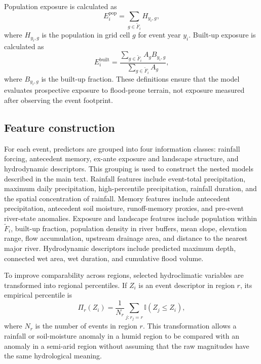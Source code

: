 \documentclass[pdflatex,sn-mathphys-ay]{sn-jnl}
\theoremstyle{thmstyleone}
\theoremstyle{thmstylethree}
\theoremstyle{thmstyletwo}
\begin{document}
\begin{appendices}
Population exposure is calculated as
\begin{equation}
  E^{\mathrm{pop}}_{i}
  =
  \sum_{g\in\widetilde{F}_{i}}
  H_{y_i,g},
  \label{eq:app_pop_exposure}
\end{equation}
where $H_{y_i,g}$ is the population in grid cell $g$ for event year
$y_i$.  Built-up exposure is calculated as
\begin{equation}
  E^{\mathrm{built}}_{i}
  =
  \frac{
    \displaystyle
    \sum_{g\in\widetilde{F}_{i}}
    A_g B_{y_i,g}
  }{
    \displaystyle
    \sum_{g\in\widetilde{F}_{i}} A_g
  },
  \label{eq:app_built_exposure}
\end{equation}
where $B_{y_i,g}$ is the built-up fraction.  These definitions ensure
that the model evaluates prospective exposure to flood-prone terrain,
not exposure measured after observing the event footprint.

\subsection{Feature construction}
\label{app:feature_construction}

For each event, predictors are grouped into four information classes:
rainfall forcing, antecedent memory, ex-ante exposure and landscape
structure, and hydrodynamic descriptors.  This grouping is used to
construct the nested models described in the main text.  Rainfall
features include event-total precipitation, maximum daily
precipitation, high-percentile precipitation, rainfall duration, and
the spatial concentration of rainfall.  Memory features include
antecedent precipitation, antecedent soil moisture, runoff-memory
proxies, and pre-event river-state anomalies.  Exposure and landscape
features include population within $\widetilde{F}_i$, built-up
fraction, population density in river buffers, mean slope, elevation
range, flow accumulation, upstream drainage area, and distance to the
nearest major river.  Hydrodynamic descriptors include predicted
maximum depth, connected wet area, wet duration, and cumulative flood
volume.

To improve comparability across regions, selected hydroclimatic
variables are transformed into regional percentiles.  If $Z_i$ is an
event descriptor in region $r$, its empirical percentile is
\begin{equation}
  \Pi_r(Z_i)
  =
  \frac{1}{N_r}
  \sum_{j:r_j=r}
  \mathbb{I}
  \left(
    Z_j\leq Z_i
  \right),
  \label{eq:app_percentile}
\end{equation}
where $N_r$ is the number of events in region $r$.  This transformation
allows a rainfall or soil-moisture anomaly in a humid region to be
compared with an anomaly in a semi-arid region without assuming that
the raw magnitudes have the same hydrological meaning.


\end{appendices}
\end{document}
